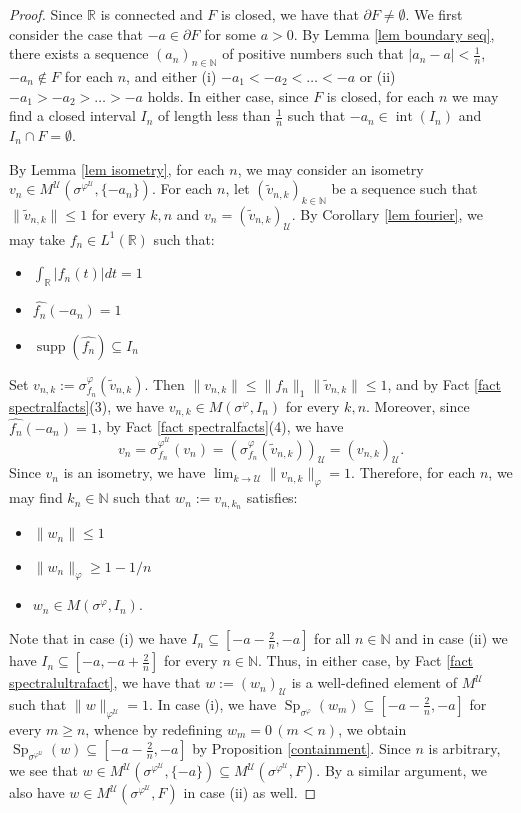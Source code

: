 \documentclass[12pt]{amsart}
\theoremstyle{definition}
\def\bb{\mathbb}
\def\bb{\mathbb}
\def\cal{\mathcal}
\def\u{\mathsf 1}
\newcommand\cU{{\cal U}}
\def \u{\mathcal U}
\begin{document}
\begin{proof}
Since $\bb R$ is connected and $F$ is closed, we have that $\partial F\neq \emptyset$. We first consider the case that $-a\in \partial F$ for some $a>0$. 
By Lemma \ref{lem boundary seq}, there exists a sequence $(a_n)_{n\in \mathbb{N}}$ of positive numbers such that $|a_n-a|<\frac{1}{n}$, $-a_n\notin F$ for each $n$, and either (i) $-a_1<-a_2<\dots<-a$ or (ii) $-a_1>-a_2>\dots>-a$ holds.  In either case, since $F$ is closed, for each $n$ we may find a closed interval $I_n$ of length less than $\frac{1}{n}$ such that $-a_n\in \operatorname{int}(I_n)$ and $I_n\cap F=\emptyset$. 

By Lemma \ref{lem isometry}, for each $n$, we may consider an isometry $v_n \in M^\mathcal{U}(\sigma^{\varphi^\mathcal{U}}, \{-a_n\})$. For each $n$, let $(\tilde{v}_{n,k})_{k\in \mathbb{N}}$ be a sequence such that $\|\tilde{v}_{n,k}\|\le 1$ for every $k,n$ and $v_n=(\tilde{v}_{n,k})_\u$. By Corollary \ref{lem fourier}, we may take $f_n\in L^1(\mathbb{R})$ such that: 
\begin{itemize}
    \item $\int_{\mathbb{R}}|f_n(t)|dt=1$
    \item $\hat{f_n}(-a_n)=1$
    \item $\operatorname{supp}(\hat{f_n})\subseteq I_n$
\end{itemize}

Set $v_{n,k}:=\sigma_{f_n}^{\varphi}(\tilde{v}_{n,k})$. Then $\|v_{n,k}\|\le \|f_n\|_1\|\tilde{v}_{n,k}\|\le 1$, and by Fact \ref{fact spectralfacts}(3), we have $v_{n,k}\in M(\sigma^{\varphi},I_n)$ for every $k,n$.  Moreover, since $\hat{f_n}(-a_n)=1$, by Fact \ref{fact spectralfacts}(4), we have 
\[v_{n}=\sigma_{f_n}^{\varphi^{\cU}}(v_{n})=(\sigma_{f_n}^{\varphi}(\tilde{v}_{n,k}))_{\cU}=(v_{n,k})_{\cU}.\]
Since $v_{n}$ is an isometry, we have 
$\displaystyle \lim_{k\to \cU}\|v_{n,k}\|_{\varphi}=1$. Therefore, for each $n$, we may find $k_n\in \mathbb{N}$ such that $w_n:=v_{n,k_n}$ satisfies:
\begin{itemize}
    \item $\|w_n\|\leq 1$
    \item $\|w_n\|_\varphi\geq 1-1/n$
    \item $w_n\in M(\sigma^\varphi,I_n)$.
\end{itemize}

Note that in case (i) we have  $I_n\subseteq [-a-\frac{2}{n},-a]$ for all $n\in \bb N$ and in case (ii) we have $I_n\subseteq [-a,-a+\frac{2}{n}]$ for every $n\in \mathbb{N}$. Thus, in either case, by Fact \ref{fact spectralultrafact}, we have that $w:=(w_n)_{\cU}$ is a well-defined element of $M^{\cU}$ such that $\|w\|_{\varphi^{\cU}}=1$. 
In case (i), we have $\operatorname{Sp}_{\sigma^{\varphi}}(w_m)\subseteq [-a-\frac{2}{n},-a]$ for every $m\ge n$, whence by redefining $w_m=0\,(m<n)$, we obtain  $\operatorname{Sp}_{\sigma^{\varphi^{\cU}}}(w)\subseteq [-a-\frac{2}{n},-a]$ by Proposition \ref{containment}. Since $n$ is arbitrary, we see that $w\in M^{\cU}(\sigma^{\varphi^{\cU}},\{-a\})\subseteq M^{\cU}(\sigma^{\varphi^{\cU}},F)$. By a similar argument, we also have $w\in M^{\cU}(\sigma^{\varphi^{\cU}},F)$ in case (ii) as well. 


\end{proof}
\end{document}

